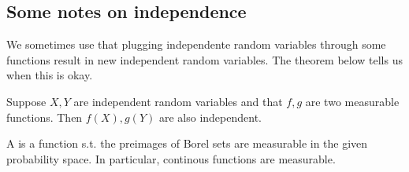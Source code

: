 

\subsection{Some notes on independence}

We sometimes use that plugging independente random variables through some functions result in new independent random variables. The theorem below tells us when this is okay. 

\begin{theorem}
    Suppose $X, Y$ are independent random variables and that $f, g$ are two measurable functions. Then $f(X), g(Y)$ are also independent. 
\end{theorem}

A  is a function s.t. the preimages of Borel sets are measurable in the given probability space. In particular, continous functions are measurable.



